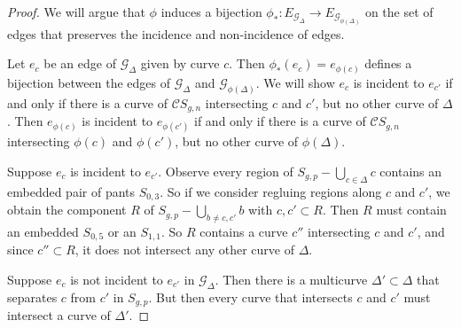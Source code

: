 \begin{proof}
  We will argue that $\phi$ induces a bijection
  $\phi_\ast : E_{\mathcal G_\Delta} \to E_{\mathcal G_{\phi(\Delta)}}$
  on the set of edges
  that preserves the incidence
  and non-incidence of edges.

  Let $e_c$ be an edge of $\mathcal G_\Delta$ given by curve $c$.
  Then $\phi_\ast (e_c) = e_{\phi(c)}$  defines a bijection
  between the edges of $\mathcal G_\Delta$ and $\mathcal G_{\phi(\Delta)}$.
  We will show $e_c$ is incident to $e_{c'}$ if
  and only if there is a curve of $\mathcal C S_{g,n}$
  intersecting $c$ and $c'$, but no other curve of $\Delta$.
  Then $e_{\phi(c)}$ is incident to $e_{\phi(c')}$
  if and only if there is a curve of $\mathcal C S_{g,n}$
  intersecting $\phi(c)$ and $\phi(c')$, but no other curve of $\phi(\Delta)$.

  Suppose $e_c$ is incident to $e_{c'}$.
  Observe every region  of
  $
  S_{g,p} - \bigcup_{c \in \Delta} c
  $
  contains an embedded pair of pants $S_{0,3}$.
  So if we consider regluing regions along $c$ and $c'$,
  we obtain the
  component $R$ of $
  S_{g,p} - \bigcup_{b\neq c,c'} b
  $
  with $c,c' \subset R$.
  Then $R$ must contain an embedded $S_{0,5}$
  or an $S_{1,1}$.
  So $R$ contains a curve $c''$ intersecting $c$ and $c'$,
  and since $c'' \subset R$, it does not intersect any other curve of $\Delta$.

  Suppose $e_c$ is not incident to $e_{c'}$ in $\mathcal G_{\Delta}$.
  Then there is a multicurve $\Delta' \subset \Delta$
  that separates $c$ from $c'$ in $S_{g,p}$.
  But then every curve that intersects $c$ and $c'$ must intersect a curve of $\Delta'$.
\end{proof}


